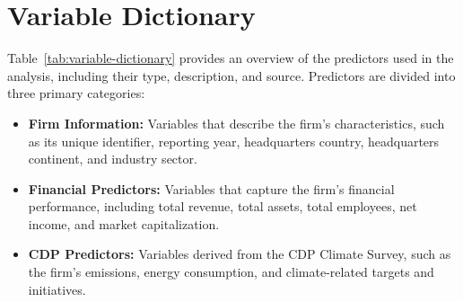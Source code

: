 \section{Variable Dictionary}
\label{sec:variable-dictionary}

\noindent Table~\ref{tab:variable-dictionary} provides an overview of the predictors used in the analysis, including their type, description, and source. Predictors are divided into three primary categories: \begin{itemize}
    \item \textbf{Firm Information:} Variables that describe the firm's characteristics, such as its unique identifier, reporting year, headquarters country, headquarters continent, and industry sector.
    \item \textbf{Financial Predictors:} Variables that capture the firm's financial performance, including total revenue, total assets, total employees, net income, and market capitalization.
    \item \textbf{CDP Predictors:} Variables derived from the CDP Climate Survey, such as the firm's emissions, energy consumption, and climate-related targets and initiatives.
\end{itemize}


